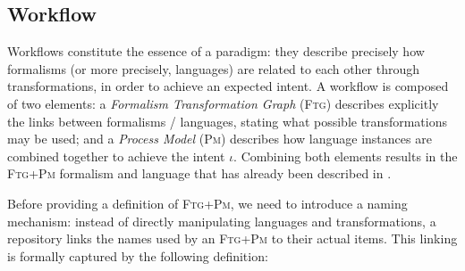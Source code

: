 

\subsection{Workflow}
\label{sec:Workflow}

Workflows constitute the essence of a paradigm: they describe precisely how 
formalisms (or more precisely, languages) are related to each other through 
transformations, in order to achieve an expected intent. 
A workflow is composed of two elements: a \emph{Formalism Transformation Graph} 
(\textsc{Ftg}) describes explicitly the links between formalisms / languages, 
stating what possible transformations may be used; and a \emph{Process Model} 
(\textsc{Pm}) describes how language instances are 
combined together to achieve the intent $\iota$. Combining both elements 
results in the \textsc{Ftg+Pm} formalism and language that has already been 
described in 
\cite{Mustafiz-etAl:2012,Lucio-Mustafiz-etAl:2013,TR:Lucio-Mustafiz-etAl:2012}.

Before providing a definition of \textsc{Ftg+Pm}, we need to introduce a naming 
mechanism: instead of directly manipulating languages and transformations, a 
repository links the names used by an \textsc{Ftg+Pm} to their actual items. 
This linking is formally captured by the following definition:



